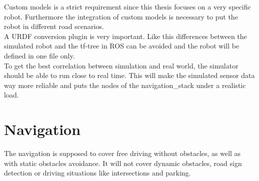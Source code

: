 Custom models is a strict requirement since this thesis focuses on a very specific robot. Furthermore the integration of custom models is necessary to put the robot in different road scenarios.\\

A URDF conversion plugin is very important. Like this differences between the simulated robot and the tf-tree in ROS can be avoided and the robot will be defined in one file only.\\

To get the best correlation between simulation and real world, the simulator should be able to run close to real time. This will make the simulated sensor data way more reliable and puts the nodes of the navigation\_stack under a realistic load.

\section{Navigation}
The navigation is supposed to cover free driving without obstacles, as well as with static obstacles avoidance. It will not cover dynamic obstacles, road sign detection or driving situations like intersections and parking.\\

